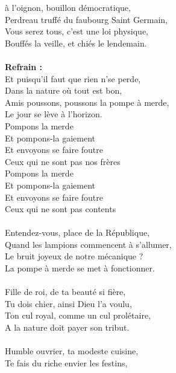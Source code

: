 
 à l'oignon, bouillon démocratique,
\\Perdreau truffé du faubourg Saint Germain,
\\Vous serez tous, c'est une loi physique,
\\Bouffés la veille, et chiés le lendemain.
\\\\\textbf{Refrain :}
\\Et puisqu'il faut que rien n'se perde,
\\Dans la nature où tout est bon,
\\Amis poussons, poussons la pompe à merde,
\\Le jour se lève à l'horizon.
\\Pompons la merde
\\Et pompons-la gaiement
\\Et envoyons se faire foutre
\\Ceux qui ne sont pas nos frères
\\Pompons la merde
\\Et pompons-la gaiement
\\Et envoyons se faire foutre
\\Ceux qui ne sont pas contents
\\\\Entendez-vous, place de la République,
\\Quand les lampions commencent à s'allumer,
\\Le bruit joyeux de notre mécanique ?
\\La pompe à merde se met à fonctionner.
\\\\Fille de roi, de ta beauté si fière,
\\Tu dois chier, ainsi Dieu l'a voulu,
\\Ton cul royal, comme un cul prolétaire,
\\A la nature doit payer son tribut.
\\\\Humble ouvrier, ta modeste cuisine,
\\Te fais du riche envier les festins,
